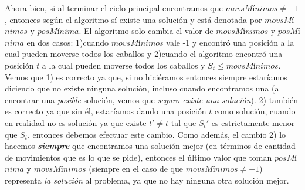 \documentclass[a4paper]{article}
\begin{document}
\newline Ahora bien, si al terminar el ciclo principal encontramos que $movsM$í$nimos \neq -1$, entonces según el algoritmo sí existe una solución y está denotada por $movsM$í$nimos$ y $posM$í$nima$. El algoritmo solo cambia el valor de $movsM$í$nimos$ y $posM$í$nima$ en dos casos: 1)cuando $movsM$í$nimos$ vale -1 y encontró una posición a la cual pueden moverse todos los caballos y 2)cuando el algoritmo encontró una posición $t$ a la cual pueden moverse todos los caballos y $S_t \le movsM$í$nimos$. Vemos que 1) es correcto ya que, si no hiciéramos entonces siempre estaríamos diciendo que no existe ninguna solución, incluso cuando encontramos una (al encontrar una \textit{posible} solución, vemos que \textit{seguro existe una solución}). 2) también es correcto ya que sin él, estaríamos dando una posición $t$ como solución, cuando en realidad no es solución ya que existe $t' \neq t$ tal que $S_t'$ es estrictamente menor que $S_t$. entonces debemos efectuar este cambio. Como además, el cambio 2) lo hacemos \textit{\textbf{siempre}} que encontramos una solución mejor (en términos de cantidad de movimientos que es lo que se pide), entonces el último valor que toman $posM$í$nima$ y $movsM$í$nimos$ (siempre en el caso de que $movsM$í$nimos \neq -1$) representa \textit{la solución} al problema, ya que no hay ninguna otra solución mejor.
\end{document}
